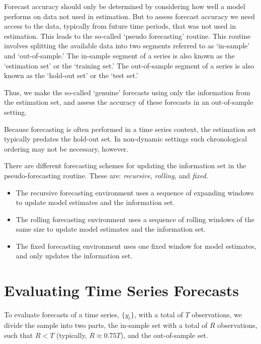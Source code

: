 \documentclass[
  oneside]{book}
\providecommand{\tightlist}{%
  \setlength{\itemsep}{0pt}\setlength{\parskip}{0pt}}
\begin{document}
Forecast accuracy should only be determined by considering how well a model performs on data not used in estimation. But to assess forecast accuracy we need access to the data, typically from future time periods, that was not used in estimation. This leads to the so-called `pseudo forecasting' routine. This routine involves splitting the available data into two segments referred to as `in-sample' and `out-of-sample.' The in-sample segment of a series is also known as the `estimation set' or the `training set.' The out-of-sample segment of a series is also known as the `hold-out set' or the `test set.'

Thus, we make the so-called `genuine' forecasts using only the information from the estimation set, and assess the accuracy of these forecasts in an out-of-sample setting.

Because forecasting is often performed in a time series context, the estimation set typically predates the hold-out set. In non-dynamic settings such chronological ordering may not be necessary, however.

There are different forecasting schemes for updating the information set in the pseudo-forecasting routine. These are: \emph{recursive}, \emph{rolling}, and \emph{fixed}.

\begin{itemize}
\tightlist
\item
  The recursive forecasting environment uses a sequence of expanding windows to update model estimates and the information set.
\item
  The rolling forecasting environment uses a sequence of rolling windows of the same size to update model estimates and the information set.
\item
  The fixed forecasting environment uses one fixed window for model estimates, and only updates the information set.
\end{itemize}

\hypertarget{evaluating-time-series-forecasts}{%
\section{Evaluating Time Series Forecasts}\label{evaluating-time-series-forecasts}}

To evaluate forecasts of a time series, \(\{y_t\}\), with a total of \(T\) observations, we divide the sample into two parts, the in-sample set with a total of \(R\) observations, such that \(R < T\) (typically, \(R \approx 0.75T\)), and the out-of-sample set.
\end{document}
